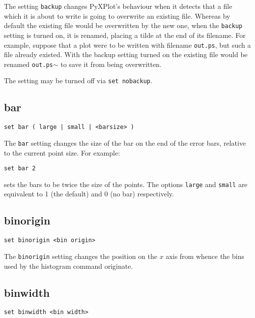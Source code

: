 The setting {\tt backup} changes PyXPlot's behaviour when it detects that a file
which it is about to write is going to overwrite an existing file. Whereas by
default the existing file would be overwritten by the new one, when the
{\tt backup} setting is turned on, it is renamed, placing a tilde at the end of
its filename. For example, suppose that a plot were to be written with filename
{\tt out.ps}, but such a file already existed.  With the backup setting turned on
the existing file would be renamed {\tt out.ps$\sim$} to save it from being overwritten.

The setting may be turned off via {\tt set nobackup}.


\subsection{bar}

\begin{verbatim}
set bar ( large | small | <barsize> )
\end{verbatim}

The {\tt bar} setting changes the size of the bar on the end of the error bars,
relative to the current point size.  For example:

\begin{verbatim}
set bar 2
\end{verbatim}

\noindent sets the bars to be twice the size of the points.  The options {\tt large} and
{\tt small} are equivalent to 1 (the default) and 0 (no bar) respectively.

\subsection{binorigin}

\begin{verbatim}
set binorigin <bin origin>
\end{verbatim}

The {\tt binorigin} setting changes the position on the $x$ axis from whence
the bins used by the histogram command originate.

\subsection{binwidth}

\begin{verbatim}
set binwidth <bin width>
\end{verbatim}

